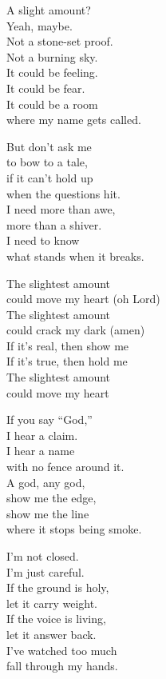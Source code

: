 \begin{lyrics}
A slight amount?\\
Yeah, maybe.\\
Not a stone-set proof.\\
Not a burning sky.\\
It could be feeling.\\
It could be fear.\\
It could be a room\\
where my name gets called.

But don’t ask me\\
to bow to a tale,\\
if it can’t hold up\\
when the questions hit.\\
I need more than awe,\\
more than a shiver.\\
I need to know\\
what stands when it breaks.

The slightest amount\\
could move my heart
(oh Lord)\\
The slightest amount\\
could crack my dark
(amen)\\
If it’s real, then show me\\
If it’s true, then hold me\\
The slightest amount\\
could move my heart

If you say “God,”\\
I hear a claim.\\
I hear a name\\
with no fence around it.\\
A god, any god,\\
show me the edge,\\
show me the line\\
where it stops being smoke.

I’m not closed.\\
I’m just careful.\\
If the ground is holy,\\
let it carry weight.\\
If the voice is living,\\
let it answer back.\\
I’ve watched too much\\
fall through my hands.


\end{lyrics}

